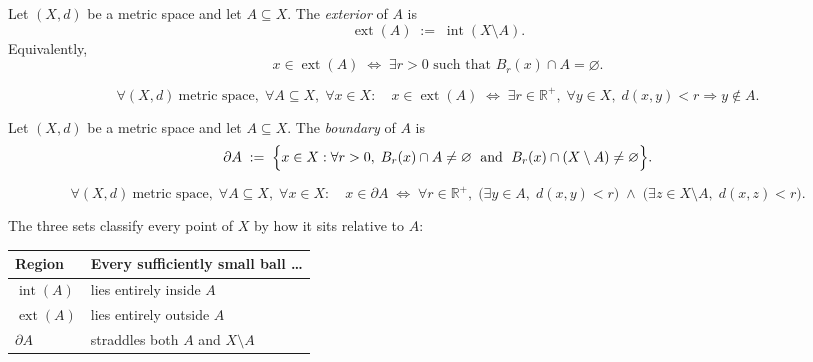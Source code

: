 \begin{tcolorbox}[colback=propbox, colframe=propborder, arc=2pt,
  left=6pt, right=6pt, top=4pt, bottom=4pt,
  title={\small\textbf{Definition (Exterior)}},
  fonttitle=\small\bfseries]
\begin{definition}[Exterior]
\label{def:exterior}
Let $(X,d)$ be a metric space and let $A \subseteq X$.
The \emph{exterior} of $A$ is
\[
  \operatorname{ext}(A)
  \;:=\;
  \operatorname{int}(X \setminus A).
\]
Equivalently,
\[
  x \in \operatorname{ext}(A)
  \;\iff\;
  \exists r > 0 \text{ such that } B_r(x) \cap A = \varnothing.
\]
\end{definition}
\end{tcolorbox}

\begin{remark*}
\[
\forall (X,d)\ \text{metric space},\;
\forall A \subseteq X,\;
\forall x \in X:\quad
x \in \operatorname{ext}(A)
\;\iff\;
\exists r \in \mathbb{R}^{+},\;
\forall y \in X,\;
d(x,y) < r \Rightarrow y \notin A.
\]
\end{remark*}

\begin{tcolorbox}[colback=propbox, colframe=propborder, arc=2pt,
  left=6pt, right=6pt, top=4pt, bottom=4pt,
  title={\small\textbf{Definition (Boundary)}},
  fonttitle=\small\bfseries]
\begin{definition}[Boundary]
\label{def:boundary}
Let $(X,d)$ be a metric space and let $A \subseteq X$.
The \emph{boundary} of $A$ is
\[
  \partial A
  \;:=\;
  \Bigl\{
    x \in X :
    \forall r > 0,\;
    B_r(x) \cap A \neq \varnothing
    \;\text{ and }\;
    B_r(x) \cap (X \setminus A) \neq \varnothing
  \Bigr\}.
\]
\end{definition}
\end{tcolorbox}

\begin{remark*}
\[
\forall (X,d)\ \text{metric space},\;
\forall A \subseteq X,\;
\forall x \in X:\quad
x \in \partial A
\;\iff\;
\forall r \in \mathbb{R}^{+},\;
\bigl(\exists y \in A,\; d(x,y) < r\bigr)
\;\land\;
\bigl(\exists z \in X \setminus A,\; d(x,z) < r\bigr).
\]
\end{remark*}

\begin{remark*}[Intuition]
The three sets classify every point of $X$ by how it sits relative to $A$:

\smallskip
\begin{center}
\begin{tabular}{l l}
\toprule
\textbf{Region} & \textbf{Every sufficiently small ball \ldots} \\
\midrule
$\operatorname{int}(A)$ & lies entirely inside $A$ \\
$\operatorname{ext}(A)$ & lies entirely outside $A$ \\
$\partial A$            & straddles both $A$ and $X \setminus A$ \\
\bottomrule
\end{tabular}
\end{center}
\end{remark*}


